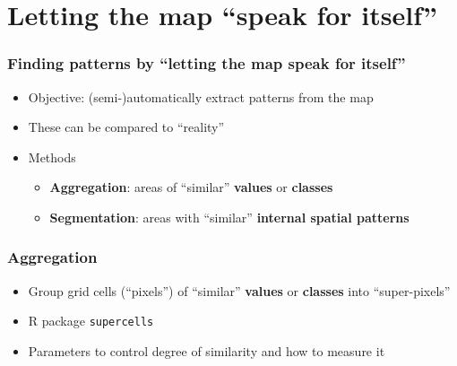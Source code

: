 \documentclass[aspectratio=169, 10pt]{beamer}
\begin{document}
\section{Letting the map ``speak for itself''}

\begin{frame}
  \frametitle{Finding patterns by ``letting the map speak for itself''}
  \begin{itemize}
  \item Objective: (semi-)automatically extract patterns from the map
  \item These can be compared to ``reality''
  \item Methods
    \begin{itemize}
    \item \textbf{Aggregation}: areas of ``similar'' \textbf{values} or \textbf{classes}
    \item \textbf{Segmentation}: areas with ``similar'' \textbf{internal spatial patterns}
    \end{itemize}
  \end{itemize}
\end{frame}

\begin{frame}
  \frametitle{Aggregation}
  \begin{itemize}
  \item Group grid cells (``pixels'')  of ``similar'' \textbf{values} or \textbf{classes} into ``super-pixels''
  \item R package \texttt{supercells}
  \item Parameters to control degree of similarity and how to measure it
  \end{itemize}
\end{frame}
\end{document}
